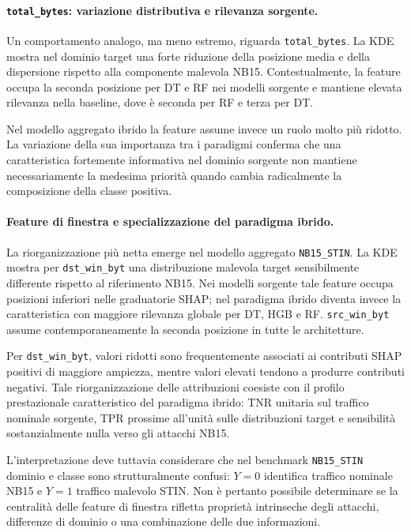 \paragraph{\texttt{total\_bytes}: variazione distributiva e rilevanza sorgente.}
Un comportamento analogo, ma meno estremo, riguarda \texttt{total\_bytes}. 
La KDE mostra nel dominio target una forte riduzione della posizione media e della dispersione rispetto alla componente malevola NB15. 
Contestualmente, la feature occupa la seconda posizione per DT e RF nei modelli sorgente e mantiene elevata rilevanza nella baseline, dove è seconda per RF e terza per DT.

Nel modello aggregato ibrido la feature assume invece un ruolo molto più ridotto. 
La variazione della sua importanza tra i paradigmi conferma che una caratteristica fortemente informativa nel dominio sorgente non mantiene necessariamente la medesima priorità quando cambia radicalmente la composizione della classe positiva.

\paragraph{Feature di finestra e specializzazione del paradigma ibrido.}
La riorganizzazione più netta emerge nel modello aggregato \texttt{NB15\_STIN}. 
La KDE mostra per \texttt{dst\_win\_byt} una distribuzione malevola target sensibilmente differente rispetto al riferimento NB15. 
Nei modelli sorgente tale feature occupa posizioni inferiori nelle graduatorie SHAP; nel paradigma ibrido diventa invece la caratteristica con maggiore rilevanza globale per DT, HGB e RF. 
\texttt{src\_win\_byt} assume contemporaneamente la seconda posizione in tutte le architetture.

Per \texttt{dst\_win\_byt}, valori ridotti sono frequentemente associati ai contributi SHAP positivi di maggiore ampiezza, mentre valori elevati tendono a produrre contributi negativi. 
Tale riorganizzazione delle attribuzioni coesiste con il profilo prestazionale caratteristico del paradigma ibrido: TNR unitaria sul traffico nominale sorgente, TPR prossime all'unità sulle distribuzioni target e sensibilità sostanzialmente nulla verso gli attacchi NB15.

L'interpretazione deve tuttavia considerare che nel benchmark \texttt{NB15\_STIN} dominio e classe sono strutturalmente confusi: $Y=0$ identifica traffico nominale NB15 e $Y=1$ traffico malevolo STIN.
Non è pertanto possibile determinare se la centralità delle feature di finestra rifletta proprietà intrinseche degli attacchi, differenze di dominio o una combinazione delle due informazioni.

